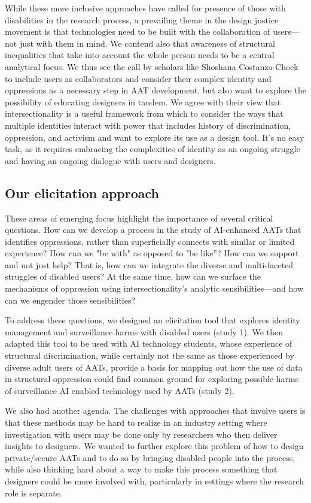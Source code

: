 \documentclass[11pt,dvipdfm]{article}
\begin{document}
While these more inclusive approaches have called for presence of those with disabilities in the research process, a prevailing theme in the design justice movement is that technologies need to be built with the collaboration of users—not just with them in mind. We contend also that awareness of structural inequalities that take into account the whole person needs to be a central analytical focus. We thus see the call by scholars like Shoshana Costanza-Chock \cite{10} to include users as collaborators and consider their complex identity and oppressions as a necessary step in AAT development, but also want to explore the possibility of educating designers in tandem. We agree with their view that intersectionality is a useful framework from which to consider the ways that multiple identities interact with power that includes history of discrimination, oppression, and activism and want to explore its use as a design tool. It’s no easy task, as it requires embracing the complexities of identity as an ongoing struggle and having an ongoing dialogue with users and designers.

\subsection{Our elicitation approach}
These areas of emerging focus highlight the importance of several critical questions. How can we develop a process in the study of AI-enhanced AATs that identifies oppressions, rather than superficially connects with similar or limited experience? How can we "be with" as opposed to "be like”? How can we support and not just help? That is, how can we integrate the diverse and multi-faceted struggles of disabled users? At the same time, how can we surface the mechanisms of oppression using intersectionality’s analytic sensibilities—and how can we engender those sensibilities? 

To address these questions, we designed an elicitation tool that explores identity management and surveillance harms with disabled users (study 1). We then adapted this tool to be used with AI technology students, whose experience of structural discrimination, while certainly not the same as those experienced by diverse adult users of AATs, provide a basis for mapping out how the use of data in structural oppression could find common ground for exploring possible harms of surveillance AI enabled technology used by AATs (study 2). 

We also had another agenda. The challenges with approaches that involve users is that these methods may be hard to realize in an industry setting where investigation with users may be done only by researchers who then deliver insights to designers. We wanted to further explore this problem of how to design private/secure AATs and to do so by bringing disabled people into the process, while also thinking hard about a way to make this process something that designers could be more involved with, particularly in settings where the research role is separate.
\end{document}

